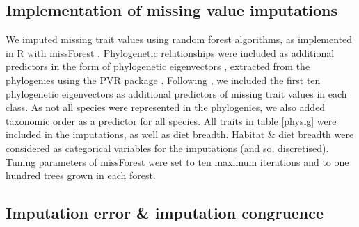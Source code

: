 \documentclass[11pt]{article}
\begin{document}

\subsection{Implementation of missing value imputations}
We imputed missing trait values using random forest algorithms, as implemented in R with missForest \citep{Stekhoven2012, Stekhoven2016}. Phylogenetic relationships were included as additional predictors in the form of phylogenetic eigenvectors \citep{DinizFilho2012}, extracted from the phylogenies using the PVR package \citep{Santos2018}. Following \citet{Penone2014}, we included the first ten phylogenetic eigenvectors as additional predictors of missing trait values in each class. As not all species were represented in the phylogenies, we also added taxonomic order as a predictor for all species. All traits in table \ref{physig} were included in the imputations, as well as diet breadth. Habitat \& diet breadth were considered as categorical variables for the imputations (and so, discretised). Tuning parameters of missForest were set to ten maximum iterations and to one hundred trees grown in each forest.



\subsection{Imputation error \& imputation congruence}
\end{document}
